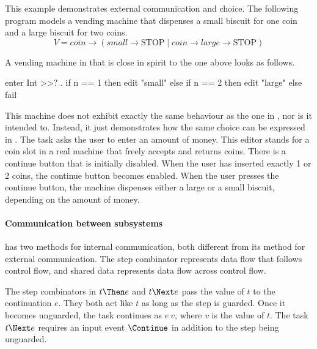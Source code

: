 \begin{example}

This example demonstrates external communication and choice.
The following \CSP program models a vending machine that dispenses a small biscuit for one coin and a large biscuit for two coins.
\begin{equation*}
  V = \textit{coin} \to (\textit{small} \to \text{STOP} \mid \textit{coin} \to \textit{large} \to \text{STOP})
\end{equation*}

A vending machine in \TOPHAT that is close in spirit to the one above looks as follows.
\begin{TASK}
  enter Int >>? \n. if n == 1 then edit "small"
    else if n == 2 then edit "large" else fail
\end{TASK}
This machine does not exhibit exactly the same behaviour as the one in \CSP, nor is it intended to.
Instead, it just demonstrates how the same choice
can be expressed in \TOP.
The task asks the user to enter an amount of money.
This editor stands for a coin slot in a real machine that freely accepts and returns coins.
There is a continue button that is initially disabled.
When the user has inserted exactly 1 or 2 coins, the continue button becomes enabled.
When the user presses the continue button, the machine dispenses either a large or a small biscuit, depending on the amount of money.

\end{example}



\paragraph{Communication between subsystems}

\TOP has two methods for internal communication, both different from its meth\-od for external communication.
The step combinator represents data flow that follows control flow, and shared data represents data flow across control flow.

The step combinators in $t \Then e$ and $t \Next e$ pass the value of $t$ to the continuation $e$.
They both act like $t$ as long as the step is guarded.
Once it becomes unguarded, the task continues as $e\ v$, where $v$ is the value of $t$.
The task $t \Next e$ requires an input event $\Continue$ in addition to the step being unguarded. %

